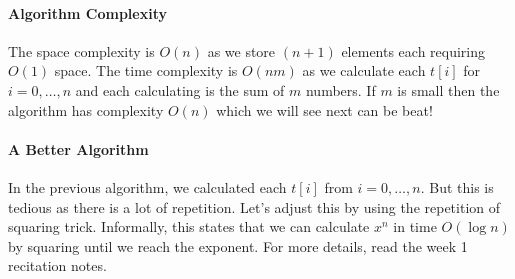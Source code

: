 \documentclass[11pt]{article}
\theoremstyle{plain}
\theoremstyle{definition}
\numberwithin{equation}{section}
\numberwithin{figure}{section}
\begin{document}
\paragraph{Algorithm Complexity} The space complexity is $O(n)$ as we store $(n + 1)$ elements each requiring $O(1)$ space. The time complexity is $O(nm)$ as we calculate each $t[i]$ for $i = 0, \ldots, n$ and each calculating is the sum of $m$ numbers. If $m$ is small then the algorithm has complexity $O(n)$ which we will see next can be beat!


\paragraph{A Better Algorithm} In the previous algorithm, we calculated each $t[i]$ from $i = 0, \ldots, n$. But this is tedious as there is a lot of repetition. Let's adjust this by using the repetition of squaring trick. Informally, this states that we can calculate $x^n$ in time $O(\log n)$ by squaring until we reach the exponent. For more details, read the week 1 recitation notes. \\
\end{document}
